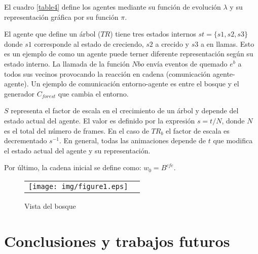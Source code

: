 \documentclass[runningheads]{llncs}
\begin{document}
\begin{table}[h]
\begin{center}
\caption{\label{table4} Definici\'on de agentes}
\end{center}
\end{table}

El cuadro \ref{table4} define los agentes mediante su funci\'on de evoluci\'on $\lambda$ y su representaci\'on gr\'afica por su funci\'on $\pi$.

El agente que define un \'arbol ($TR$) tiene tres estados internos $st = \{s1, s2, s3\}$ donde $s1$ corresponde al estado de creciendo, $s2$ a crecido y $s3$ a en llamas. Esto es un ejemplo de como un agente puede terner diferente representaci\'on seg\'un su estado interno. La llamada de la funci\'on $Nbo$ env\'ia eventos de quemado $e^b$ a todos sus vecinos provocando la reacci\'on en cadena (comunicaci\'on agente-agente). Un ejemplo de comunicaci\'on entorno-agente es entre el bosque y el generador $C_{forest}$ que cambia el entorno.

$S$ representa el factor de escala en el crecimiento de un \'arbol y depende del estado actual del agente. El valor es definido por la expresi\'on $s = t / N$, donde $N$ es el total del n\'umero de frames. En el caso de $TR_b$ el factor de escala es decrementado $s^{-1}$. En general, todas las animaciones depende de $t$ que modifica el estado actual del agente y su representaci\'on.

Por \'ultimo, la cadena inicial se define como: $w_{0}=B^{cfe}$.

\begin{figure}[htb]
  	\centering
	\begin{tabular}{cc}
  		\texttt{[image: img/figure1.eps]}
	\end{tabular}
 	\caption{\label{fig:ejemplo} Vista del bosque}
\end{figure}



\section{Conclusiones y trabajos futuros \label{Conclusiones}}
\end{document}
